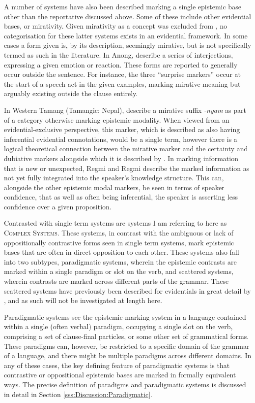 A number of systems have also been described marking a single epistemic base other than the reportative discussed above. Some of these include other evidential bases, or mirativity. Given mirativity as a concept was excluded from , no categorisation for these latter systems exists in an evidential framework. In some cases a form given is, by its description, seemingly mirative, but is not specifically termed as such in the literature. In Anong,  describe a series of interjections, expressing a given emotion or reaction. These forms are reported to generally occur outside the sentence. For instance, the three ``surprise markers'' \cite[111]{Sun2009} occur at the start of a speech act in the given examples, marking mirative meaning but arguably existing outside the clause entirely. 

In Western Tamang (Tamangic: Nepal),  describe a mirative suffix \textit{-nyam} as part of a category otherwise marking epistemic modality. When viewed from an evidential-exclusive perspective, this marker, which is described as also having inferential evidential connotations, would be a single term, however there is a logical theoretical connection between the mirative marker and the certainty and dubiative markers alongside which it is described by . In marking information that is new or unexpected, Regmi and Regmi describe the marked information as not yet fully integrated into the speaker's knowledge structure. This can, alongside the other epistemic modal markers, be seen in terms of speaker confidence, that as well as often being inferential, the speaker is asserting less confidence over a given proposition.

Contrasted with single term systems are systems I am referring to here as \textsc{Complex Systems}. These systems, in contrast with the ambiguous or lack of oppositionally contrastive forms seen in single term systems, mark epistemic bases that are often in direct opposition to each other. These systems also fall into two subtypes, paradigmatic systems, wherein the epistemic contrasts are marked within a single paradigm or slot on the verb, and scattered systems, wherein contrasts are marked across different parts of the grammar. These scattered systems have previously been described for evidentials in great detail by , and as such will not be investigated at length here.

Paradigmatic systems see the epistemic-marking system in a language contained within a single (often verbal) paradigm, occupying a single slot on the verb, comprising a set of clause-final particles, or some other set of grammatical forms. These paradigms can, however, be restricted to a specific domain of the grammar of a language, and there might be multiple paradigms across different domains. In any of these cases, the key defining feature of paradigmatic systems is that contrastive or oppositional epistemic bases are marked in formally equivalent ways. The precise definition of paradigms and paradigmatic systems is discussed in detail in Section \ref{sss:Discussion:Paradigmatic}.

